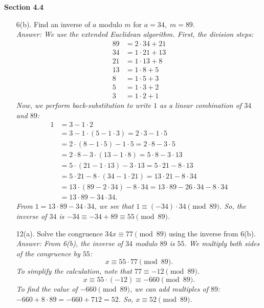 \documentclass{article}
\begin{document}
\bigskip

\noindent \textbf{Section 4.4}
\begin{itemize}
    \item[6(b).] Find an inverse of $a$ modulo $m$ for $a=34,\; m=89$.
    \medskip\\
    \textit{Answer: We use the extended Euclidean algorithm. First, the division steps:
    \[
    \begin{alignedat}{2}
        89&=2\cdot 34+21 \\
        34&=1\cdot 21+13 \\
        21&=1\cdot 13+8 \\
        13&=1\cdot 8+5 \\
        8&=1\cdot 5+3 \\
        5&=1\cdot 3+2 \\
        3&=1\cdot 2+1
    \end{alignedat}
    \]
    Now, we perform back-substitution to write $1$ as a linear combination of $34$ and $89$:
    \[
    \begin{aligned}
        1 &= 3 - 1 \cdot 2 \\
        &= 3 - 1 \cdot (5 - 1 \cdot 3) = 2 \cdot 3 - 1 \cdot 5 \\
        &= 2 \cdot (8 - 1 \cdot 5) - 1 \cdot 5 = 2 \cdot 8 - 3 \cdot 5 \\
        &= 2 \cdot 8 - 3 \cdot (13 - 1 \cdot 8) = 5 \cdot 8 - 3 \cdot 13 \\
        &= 5 \cdot (21 - 1 \cdot 13) - 3 \cdot 13 = 5 \cdot 21 - 8 \cdot 13 \\
        &= 5 \cdot 21 - 8 \cdot (34 - 1 \cdot 21) = 13 \cdot 21 - 8 \cdot 34 \\
        &= 13 \cdot (89 - 2 \cdot 34) - 8 \cdot 34 = 13 \cdot 89 - 26 \cdot 34 - 8 \cdot 34 \\
        &= 13 \cdot 89 - 34 \cdot 34.
    \end{aligned}
    \]
    From $1 = 13 \cdot 89 - 34 \cdot 34$, we see that $1 \equiv (-34) \cdot 34 \pmod{89}$.
    So, the inverse of $34$ is $-34 \equiv -34 + 89 \equiv \boxed{55} \pmod{89}$.}

    \medskip

    \item[12(a).] Solve the congruence $34x \equiv 77 \pmod{89}$ using the inverse from 6(b).
    \medskip\\
    \textit{Answer: From 6(b), the inverse of $34$ modulo $89$ is $55$. We multiply both sides of the congruence by $55$:
    \[
        x \equiv 55 \cdot 77 \pmod{89}.
    \]
    To simplify the calculation, note that $77 \equiv -12 \pmod{89}$.
    \[
        x \equiv 55 \cdot (-12) \equiv -660 \pmod{89}.
    \]
    To find the value of $-660 \pmod{89}$, we can add multiples of $89$:
    $-660 + 8 \cdot 89 = -660 + 712 = 52$.
    So, $x \equiv \boxed{52} \pmod{89}$.}


\end{itemize}
\end{document}

